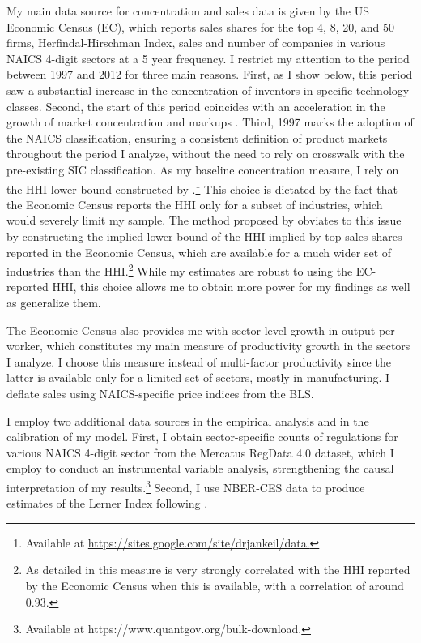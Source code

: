 My main data source for concentration and sales data is given by the
US Economic Census (EC), which reports sales shares for the top 4,
8, 20, and 50 firms, Herfindal-Hirschman Index, sales and number of
companies in various NAICS 4-digit sectors at a 5 year frequency.
I restrict my attention to the period between 1997 and 2012 for three
main reasons. First, as I show below, this period saw a substantial
increase in the concentration of inventors in specific technology
classes. Second, the start of this period coincides with an acceleration
in the growth of market concentration and markups \citep[see,  e.g., ][]{deloeckerRiseMarketPower2020}.
Third, 1997 marks the adoption of the NAICS classification, ensuring
a consistent definition of product markets throughout the period I
analyze, without the need to rely on crosswalk with the pre-existing
SIC classification. As my baseline concentration measure, I rely on
the HHI lower bound constructed by \citet{keilTroubleApproximatingIndustry2017}.\footnote{Available at \href{https://sites.google.com/site/drjankeil/data.}{https://sites.google.com/site/drjankeil/data.}}
This choice is dictated by the fact that the Economic Census reports
the HHI only for a subset of industries, which would severely limit
my sample. The method proposed by \citet{keilTroubleApproximatingIndustry2017}
obviates to this issue by constructing the implied lower bound of
the HHI implied by top sales shares reported in the Economic Census,
which are available for a much wider set of industries than the HHI.\footnote{As detailed in \citet{keilTroubleApproximatingIndustry2017} this
measure is very strongly correlated with the HHI reported by the Economic
Census when this is available, with a correlation of around 0.93.} While my estimates are robust to using the EC-reported HHI, this
choice allows me to obtain more power for my findings as well as generalize
them.

The Economic Census also provides me with sector-level growth in output
per worker, which constitutes my main measure of productivity growth
in the sectors I analyze. I choose this measure instead of multi-factor
productivity since the latter is available only for a limited set
of sectors, mostly in manufacturing. I deflate sales using NAICS-specific
price indices from the BLS.

I employ two additional data sources in the empirical analysis and
in the calibration of my model. First, I obtain sector-specific counts
of regulations for various NAICS 4-digit sector from the Mercatus
RegData 4.0 dataset, which I employ to conduct an instrumental variable
analysis, strengthening the causal interpretation of my results.\footnote{Available at https://www.quantgov.org/bulk-download.}
Second, I use NBER-CES data to produce estimates of the Lerner Index
following \citet{grullonAreUSIndustries2019a}.

